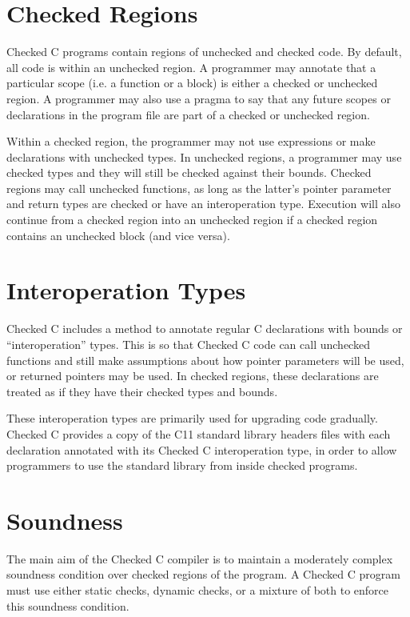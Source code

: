 \section{Checked Regions}
\label{sec:checked-regions}

Checked C programs contain regions of unchecked and checked code. By
default, all code is within an unchecked region. A programmer may
annotate that a particular scope (i.e. a function or a block) is
either a checked or unchecked region. A programmer may also use a
pragma to say that any future scopes or declarations in the program
file are part of a checked or unchecked region.

Within a checked region, the programmer may not use expressions or
make declarations with unchecked types. In unchecked regions, a
programmer may use checked types and they will still be checked
against their bounds. Checked regions may call unchecked functions, as
long as the latter's pointer parameter and return types are checked or
have an interoperation type. Execution will also continue from a
checked region into an unchecked region if a checked region contains
an unchecked block (and vice versa).

\section{Interoperation Types}
\label{sec:interoperation-types}

Checked C includes a method to annotate regular C declarations with
bounds or ``interoperation'' types. This is so that Checked C code can
call unchecked functions and still make assumptions about how pointer
parameters will be used, or returned pointers may be used. In checked
regions, these declarations are treated as if they have their checked
types and bounds.

These interoperation types are primarily used for upgrading code
gradually. Checked C provides a copy of the C11 standard library
headers files with each declaration annotated with its Checked C
interoperation type, in order to allow programmers to use the
standard library from inside checked programs.

\section{Soundness}
\label{sec:soundness}

The main aim of the Checked C compiler is to maintain a moderately
complex soundness condition over checked regions of the program. A
Checked C program must use either static checks, dynamic checks, or a
mixture of both to enforce this soundness condition.

